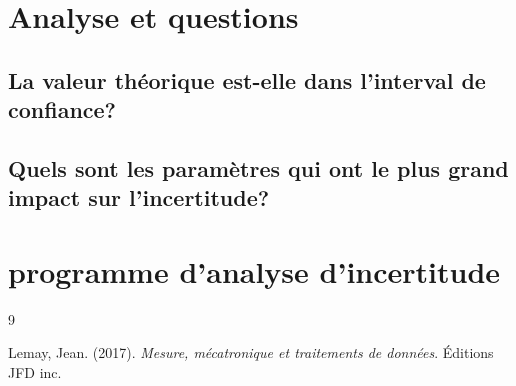 \documentclass[11pt,twoside]{article}
\numberwithin{figure}{section}
\begin{document}
\newpage{}
\section{Analyse et questions}
\thispagestyle{empty}

\subsection{La valeur théorique est-elle dans l'interval de confiance?}

\subsection{Quels sont les paramètres qui ont le plus grand impact sur l'incertitude?}

\newpage{}
\section{programme d'analyse d'incertitude}
\thispagestyle{empty}


\newpage
\thispagestyle{empty}
\begin{thebibliography}{9}

Lemay, Jean.
(2017).
\textit{Mesure, mécatronique et traitements de données}.
Éditions JFD inc.


\end{thebibliography}
\end{document}
